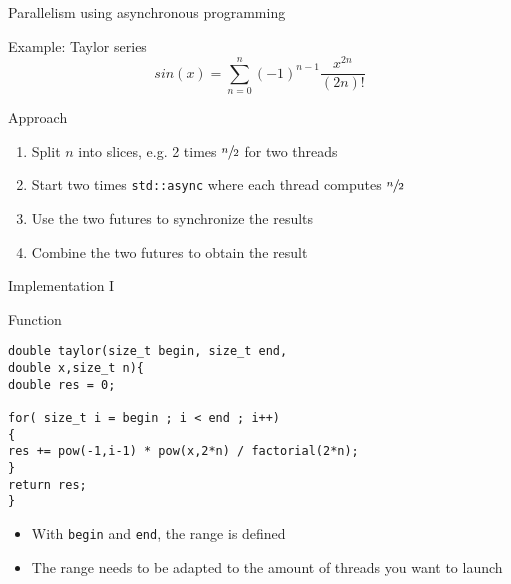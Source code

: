 \documentclass[12pt,t]{beamer}
\begin{document}
\begin{frame}{Parallelism using asynchronous programming}

\begin{block}{Example: Taylor series}
$$
sin(x) = \sum\limits_{n=0}^n (-1)^{n-1} \frac{x^{2n}}{(2n)!} 
$$
\end{block}

\begin{block}{Approach}
\begin{enumerate}
\item Split $n$ into slices, e.g. 2 times $\sfrac{n}{2}$ for two threads
\item Start two times \lstinline|std::async| where each thread computes $\sfrac{n}{2}$
\item Use the two futures to synchronize the results
\item Combine the two futures to obtain the result
\end{enumerate}
\end{block}

\end{frame}

\begin{frame}[fragile]{Implementation I}

\begin{block}{Function}
\begin{lstlisting}
double taylor(size_t begin, size_t end, 
double x,size_t n){
double res = 0;

for( size_t i = begin ; i < end ; i++)
{
res += pow(-1,i-1) * pow(x,2*n) / factorial(2*n);
} 
return res;
}

\end{lstlisting}
\end{block}

\begin{itemize}
\item With \lstinline|begin| and \lstinline|end|, the range is defined
\item The range needs to be adapted to the amount of threads you want to launch
\end{itemize}
\end{frame}
\end{document}
